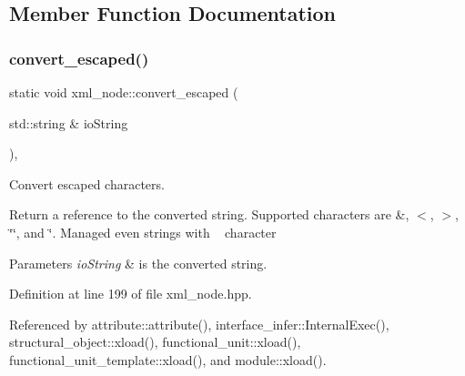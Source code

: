 \subsection{Member Function Documentation}
\mbox{\label{classxml__node_aa867d7c40fe47d98344e38b37fd34c1d}} 
\subsubsection{\texorpdfstring{convert\+\_\+escaped()}{convert\_escaped()}}
{\footnotesize\ttfamily static void xml\+\_\+node\+::convert\+\_\+escaped (\begin{DoxyParamCaption}\item[{std\+::string \&}]{io\+String }\end{DoxyParamCaption})\hspace{0.3cm}{\ttfamily [inline]}, {\ttfamily [static]}}



Convert escaped characters. 

Return a reference to the converted string. Supported characters are \textquotesingle{}\&\textquotesingle{}, \textquotesingle{}$<$\textquotesingle{}, \textquotesingle{}$>$\textquotesingle{}, \char`\"{}\textquotesingle{}\char`\"{}, and \textquotesingle{}\char`\"{}\textquotesingle{}. Managed even strings with \textquotesingle{}~\newline
\textquotesingle{} character 
\begin{DoxyParams}{Parameters}
{\em io\+String} & is the converted string. \\
\hline
\end{DoxyParams}


Definition at line 199 of file xml\+\_\+node.\+hpp.



Referenced by attribute\+::attribute(), interface\+\_\+infer\+::\+Internal\+Exec(), structural\+\_\+object\+::xload(), functional\+\_\+unit\+::xload(), functional\+\_\+unit\+\_\+template\+::xload(), and module\+::xload().

